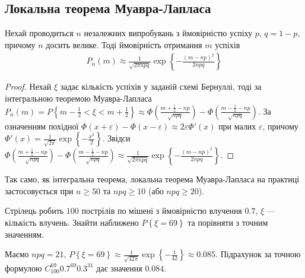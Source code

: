 \subsection{Локальна теорема Муавра-Лапласа}
\begin{theorem*}
    Нехай проводиться $n$ незалежних випробувань з ймовірністю успіху $p$, $q = 1-p$, причому $n$ досить велике.
    Тоді ймовірність отримання $m$ успіхів 
    \begin{gather}
        P_n(m) \approx \frac{1}{\sqrt{2\pi n p q}} \exp \left\{ - \frac{(m - np)^2}{2npq}\right\}
    \end{gather}
\end{theorem*}
\begin{proof}
    Нехай $\xi$ задає кількість успіхів у заданій схемі Бернуллі, тоді за інтегральною теоремою Муавра-Лапласа
    $P_n(m) = P\left\{ m-\frac{1}{2} < \xi < m+\frac{1}{2}\right\} \approx 
    \Phi\left(\frac{m+\frac{1}{2}- np}{\sqrt{n p q}}\right) - \Phi\left(\frac{m-\frac{1}{2} - np}{\sqrt{n p q}}\right)$.
    За означенням похідної $\Phi(x + \varepsilon) - \Phi(x - \varepsilon) \approx 2 \varepsilon \Phi'(x)$ при малих $\varepsilon$,
    причому $\Phi'(x) = \frac{1}{\sqrt{2\pi}} \exp \left\{ - \frac{x^2}{2}\right\}$.
    Звідси 
    $\Phi\left(\frac{m+\frac{1}{2}- np}{\sqrt{n p q}}\right) - \Phi\left(\frac{m-\frac{1}{2} - np}{\sqrt{n p q}}\right) \approx
    \frac{1}{\sqrt{2\pi n p q}} \exp \left\{ - \frac{(m - np)^2}{2npq}\right\}$.
\end{proof}
\begin{remark}
    Так само, як інтегральна теорема, локальна теорема Муавра-Лапласа на практиці застосовується при $n \geq 50$ та $npq \geq 10$ (або $npq \geq 20$).
\end{remark}
\begin{example}
    Стрілець робить $100$ пострілів по мішені з ймовірністю влучення $0.7$, $\xi$ --- кількість влучень. Знайти наближено
    $P\left\{ \xi = 69\right\}$ та порівняти з точним значенням.

    \noindent Маємо $npq = 21$, $P\left\{ \xi = 69\right\} \approx \frac{1}{\sqrt{42\pi}} \exp\left\{ -\frac{1}{42}\right\} \approx 0.085$.
    Підрахунок за точною формулою $C_{100}^{69} 0.7^{69} 0.3^{31}$ дає значення $0.084$.
\end{example}

